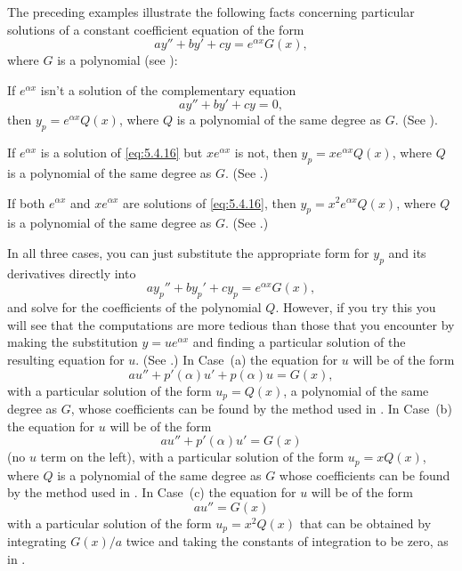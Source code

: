 
The preceding examples illustrate the following facts concerning
 particular solutions of a constant coefficient equation of the form
\[
ay''+by'+cy=e^{\alpha x}G(x),
\]
where $G$ is a polynomial (see ):
\begin{alist}
\item %
If $e^{\alpha x}$ isn't  a solution of the complementary
equation
\begin{equation} \label{eq:5.4.16}
ay''+by'+cy=0,
\end{equation}
then  $y_p=e^{\alpha x}Q(x)$,
 where $Q$ is a polynomial of the same degree as $G$.
(See ).
\item %
If $e^{\alpha x}$ is a solution of \eqref{eq:5.4.16} but $xe^{\alpha x}$
is not, then  $y_p=xe^{\alpha x}Q(x)$,
 where $Q$ is a polynomial of the same degree as $G$.
(See .)
\item %
If both $e^{\alpha x}$ and $xe^{\alpha x}$ are solutions of \eqref{eq:5.4.16},
then  $y_p=x^2e^{\alpha x}Q(x)$,
 where $Q$ is a polynomial of the same degree as $G$.
(See .)
\end{alist}

In all three cases, you can just substitute the appropriate form for
$y_p$ and its derivatives directly into
\[
ay_p''+by_p'+cy_p=e^{\alpha x}G(x),
\]
and solve for the coefficients of the polynomial $Q$. However, if you
try this you will see that the computations are more tedious than
those that you encounter by making the substitution $y=ue^{\alpha x}$
and finding a particular solution of the resulting equation for $u$.
(See .) In Case~(a)
the equation for $u$ will be of the form
\[
au''+p'(\alpha)u'+p(\alpha)u=G(x),
\]
with a particular solution of the form $u_p=Q(x)$, a polynomial of the
same degree as $G$, whose coefficients can be found by the method used
in . In Case~(b)  the equation for
$u$ will be of the form
\[
au''+p'(\alpha)u'=G(x)
\]
(no $u$ term on the left), with a particular solution of the form
$u_p=xQ(x)$, where $Q$ is a polynomial of the same degree as $G$ whose
coefficients can be found by the method used in
. In Case~(c)  the equation for $u$
will be of the form
\[
au''=G(x)
\]
with a particular solution of the form $u_p=x^2Q(x)$ that can be
obtained by integrating $G(x)/a$ twice and taking the constants of
integration to be zero, as in .


